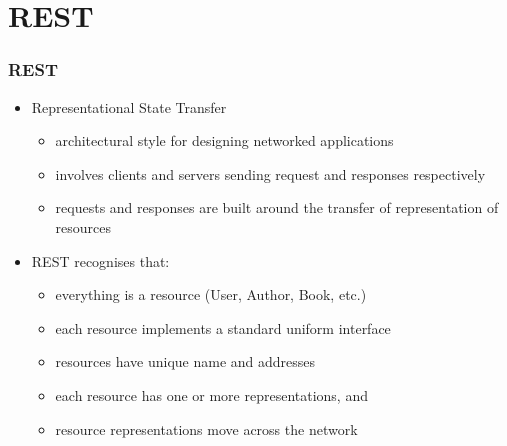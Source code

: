 \documentclass{beamer}
\begin{document}
\section{REST} 
\begin{frame}[fragile]\frametitle{REST} 

  \begin{itemize}
    \item Representational State Transfer
    \begin{itemize}
      \item architectural style for designing networked applications
      \item involves clients and servers sending request and responses respectively
      \item requests and responses are built around the transfer of representation of resources
    \end{itemize}
    
    \item REST recognises that:
    \begin{itemize}
      \item everything is a resource (User, Author, Book, etc.)
      \item each resource implements a standard uniform interface
      \item resources have unique name and addresses 
      \item each resource has one or more representations, and
      \item resource representations move across the network
    \end{itemize}
    
  \end{itemize}

\end{frame}
\end{document}

